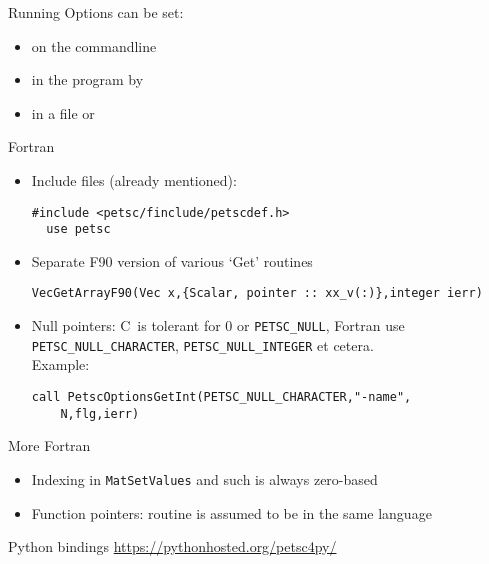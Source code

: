 \begin{numberedframe}{Running}
Options can be set:
\begin{itemize}
\item on the commandline
\item in the program by 
\item in a file  or 
\end{itemize}
\end{numberedframe}

\begin{fortran}
\begin{numberedframe}{Fortran}

  \begin{itemize}
  \item Include files (already mentioned):
\begin{verbatim}
#include <petsc/finclude/petscdef.h>
  use petsc
\end{verbatim}
  \item Separate F90 version of various `Get' routines
\begin{verbatim}
VecGetArrayF90(Vec x,{Scalar, pointer :: xx_v(:)},integer ierr)
\end{verbatim}
\item Null pointers: C~is tolerant for 0 or \lstinline{PETSC_NULL}, Fortran
    use \lstinline{PETSC_NULL_CHARACTER}, \lstinline{PETSC_NULL_INTEGER} et cetera.\\
    Example:
\begin{verbatim}
call PetscOptionsGetInt(PETSC_NULL_CHARACTER,"-name",
    N,flg,ierr)
\end{verbatim}
  \end{itemize}
\end{numberedframe}
\end{fortran}

\begin{fortran}
\begin{numberedframe}{More Fortran}
  \begin{itemize}
  \item Indexing in \lstinline{MatSetValues} and such is always zero-based
  \item Function pointers: routine is assumed to be in the same language
  \end{itemize}
\end{numberedframe}
\end{fortran}

\begin{python}
\begin{numberedframe}{Python bindings}
  \url{https://pythonhosted.org/petsc4py/}
\end{numberedframe}
\end{python}

